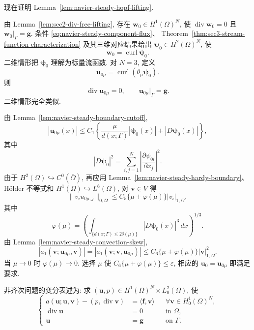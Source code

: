 现在证明 Lemma~\ref{lem:navier-steady-hopf-lifting}.
\begin{Proof}
由 Lemma~\ref{lem:sec2-div-free-lifting}, 存在
$\mathbf w_0\in H^1(\Omega)^N$, 使
$\operatorname{div}\mathbf w_0=0$ 且 $\mathbf w_0|_\Gamma=\mathbf g$.
条件 \eqref{eq:navier-steady-component-flux}、
Theorem~\ref{thm:sec3-stream-function-characterization} 及其三维对应结果给出
$\boldsymbol\psi_0\in H^2(\Omega)^N$, 使
\[
\mathbf w_0=\operatorname{curl}\boldsymbol\psi_0.
\]
二维情形把 $\boldsymbol\psi_0$ 理解为标量流函数. 对 $N=3$, 定义
\[
\mathbf u_{0\mu}
=\operatorname{curl}(\theta_\mu\boldsymbol\psi_0).
\]
则
\[
\operatorname{div}\mathbf u_{0\mu}=0,
\qquad
\mathbf u_{0\mu}|_\Gamma=\mathbf g.
\]
二维情形完全类似.

由 Lemma~\ref{lem:navier-steady-boundary-cutoff},
\[
|\mathbf u_{0\mu}(x)|
\leq C_1\left\{
\frac{\mu}{d(x;\Gamma)}|\boldsymbol\psi_0(x)|
+|D\boldsymbol\psi_0(x)|\right\},
\]
其中
\[
|D\boldsymbol\psi_0|^2
=\sum_{i,j=1}^{N}
\left|\frac{\partial\psi_{0i}}{\partial x_j}\right|^2.
\]
由于 $H^2(\Omega)\hookrightarrow C^0(\overline\Omega)$, 再应用
Lemma~\ref{lem:navier-steady-hardy-boundary}、H\"older 不等式和
$H^1(\Omega)\hookrightarrow L^6(\Omega)$, 对
$\mathbf v\in V$ 得
\[
\|v_i u_{0\mu,j}\|_{0,\Omega}
\leq C_5\{\mu+\varphi(\mu)\}|v_i|_{1,\Omega},
\]
其中
\[
\varphi(\mu)=
\left(\int_{\{d(x;\Gamma)\leq2\delta(\mu)\}}
|D\boldsymbol\psi_0(x)|^3\,dx\right)^{1/3}.
\]
由 Lemma~\ref{lem:navier-steady-convection-skew},
\[
|a_1(\mathbf v;\mathbf u_{0\mu},\mathbf v)|
=|a_1(\mathbf v;\mathbf v,\mathbf u_{0\mu})|
\leq C_6\{\mu+\varphi(\mu)\}|\mathbf v|_{1,\Omega}^2.
\]
当 $\mu\to0$ 时 $\varphi(\mu)\to0$. 选择 $\mu$ 使
$C_6\{\mu+\varphi(\mu)\}\leq\varepsilon$, 相应的
$\mathbf u_0=\mathbf u_{0\mu}$ 即满足要求.
\end{Proof}

非齐次问题的变分表述为: 求
$(\mathbf u,p)\in H^1(\Omega)^N\times L_0^2(\Omega)$, 使
\begin{equation}\label{eq:navier-steady-nonhomogeneous-variational}
\left\{
\begin{aligned}
a(\mathbf u;\mathbf u,\mathbf v)
-(p,\operatorname{div}\mathbf v)
&=\langle\mathbf f,\mathbf v\rangle
&&\forall\mathbf v\in H_0^1(\Omega)^N,\\
\operatorname{div}\mathbf u&=0&&\text{in }\Omega,\\
\mathbf u&=\mathbf g&&\text{on }\Gamma.
\end{aligned}
\right.
\end{equation}

